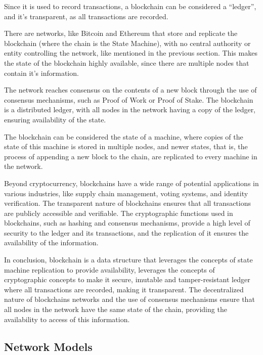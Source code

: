 Since it is used to record transactions, a blockchain can be considered a ``ledger'', and it's transparent, as all transactions are recorded.

There are networks, like Bitcoin and Ethereum that store and replicate the blockchain (where the chain is the State Machine), with no central authority or entity controlling the network, like mentioned in the previous section. This makes the state of the blockchain highly available, since there are multiple nodes that contain it's information. 

The network reaches consensus on the contents of a new block through the use of consensus mechanisms, such as Proof of Work or Proof of Stake.
The blockchain is a distributed ledger, with all nodes in the network having a copy of the ledger, ensuring availability of the state.

The blockchain can be considered the state of a machine, where copies of the state of this machine is stored in multiple nodes, and newer states, that is, the process of appending a new block to the chain, are replicated to every machine in the network.

Beyond cryptocurrency, blockchains have a wide range of potential applications in various industries, like supply chain management, voting systems, and identity verification. The transparent nature of blockchains ensures that all transactions are publicly accessible and verifiable. The cryptographic functions used in blockchains, such as hashing and consensus mechanisms, provide a high level of security to the ledger and its transactions, and the replication of it ensures the availability of the information.

In conclusion, blockchain is a data structure that leverages the concepts of state machine replication to provide availability, leverages the concepts of cryptographic concepts to make it secure, imutable and tamper-resistant ledger where all transactions are recorded, making it transparent.
The decentralized nature of blockchains networks and the use of consensus mechanisms ensure that all nodes in the network have the same state of the chain, providing the availability to access of this information.

\subsection*{\textbf{Network Models}}

